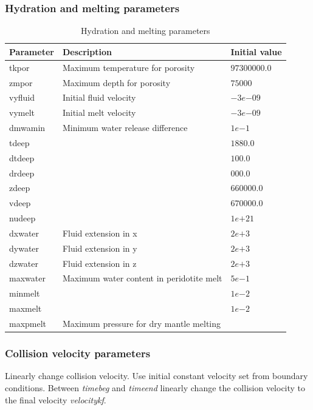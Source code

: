 \subsubsection{Hydration and melting parameters}

\begin{table}[H]
\small
\centering
\begin{tabular}{l p{7cm} l}
\toprule
Parameter & Description & Initial value \\
\midrule
tkpor 		& Maximum temperature for porosity & $97300000.0$\\
zmpor 		& Maximum depth for porosity & $75000$\\
vyfluid 	& Initial fluid velocity & $-3e{-09}$\\
vymelt 		& Initial melt velocity & $-3e{-09}$\\
dmwamin 	& Minimum water release difference & $1e{-1}$\\
tdeep 		& \todo{???} & $1880.0$\\
dtdeep 		& \todo{???} & $100.0$\\
drdeep 		& \todo{???} & $000.0$\\
zdeep 		& \todo{???} & $660000.0$\\
vdeep		& \todo{???} & $670000.0$\\
nudeep		& \todo{???} & $1e{+21}$\\
dxwater		& Fluid extension in x & $2e{+3}$\\
dywater		& Fluid extension in y & $2e{+3}$\\
dzwater		& Fluid extension in z & $2e{+3}$\\
maxwater	& Maximum water content in peridotite melt & $5e{-1}$\\
minmelt		& \todo{???} & $1e{-2}$\\
maxmelt		& \todo{???} & $1e{-2}$\\
maxpmelt	& Maximum pressure for dry mantle melting & \\
\bottomrule
\end{tabular}
\caption{Hydration and melting parameters}
\label{tbl:mode_melting_parameters}
\end{table}

\subsubsection{Collision velocity parameters}

Linearly change collision velocity. Use initial constant velocity set from boundary conditions. Between \emph{timebeg} and \emph{timeend} linearly change the collision velocity to the final velocity \emph{velocitykf}.

